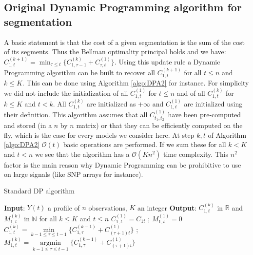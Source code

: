 \documentclass[11pt]{llncs}
\begin{document}
\subsection{Original Dynamic Programming algorithm for segmentation}

A basic statement is that the cost of a given segmentation is the sum of the cost of its segments. Thus the Bellman optimality principal holds and we have: $ C_{1, t}^{(k+1)} = \min_{\tau \leq t} \{ C_{1, \tau -1}^{(k)}  + C_{\tau, t}^{(1)} \} .$
Using this update rule  a Dynamic Programming algorithm can be built to recover all $ C_{1, t}^{(k+1)}$ for all $t \leq n$ and $k \leq K$.
This can be done using Algorithm \ref{algo:DPA2} for instance. 
For simplicity we did not include the initialization of all $C^{(1)}_{1,t}$ for $t \leq n$ and of all $C^{(k)}_{1,t}$ for $k \leq K$ and $t < k$.
All $C^{(k)}_{1,t}$ are initialized as $+\infty$ and $C^{(1)}_{1,t}$ are initialized using their definition.
This algorithm assumes that all $C_{t_1, t_2}^{(1)}$ have been pre-computed and stored (in 
a $n$ by $n$ matrix) or that they can be efficiently computed on the fly, which is the case for every models we consider here. At step $k, t$ of Algorithm \ref{algo:DPA2}  $\mathcal{O}(t)$ basic operations are performed. If we sum these for all $k < K$ and $t < n$  we see that the algorithm has a $\mathcal{O}(Kn^2)$ time complexity. This $n^2$ factor is the main reason why Dynamic Programming can be prohibitive to use on large signals (like SNP arrays for instance).
\begin{algorithm}
  \caption{Standard DP algorithm}\label{algo:DPA2}
  \begin{algorithmic}
    \State \textbf{Input}: $Y(t)$ a profile of $n$ observations, $K$ an integer
    \State \textbf{Output}: $C^{(k)}_{1,t}$ in $\mathbb{R}$ and $M^{(k)}_{1,t}$ in $\mathbb{N}$ for all $k \leq K$ and $t \leq n$
         \State $C^{(1)}_{1,t} = C_{1t}$ ; $M^{(1)}_{1,t} = 0$  
    \EndFor
     	\State $C^{(k)}_{1,t} = \underset{k-1 \leq \tau \leq t-1}{\min} \{ C^{(k-1)}_{1,\tau}+ C_{(\tau+1)t}^{(1)} \}$ ; $M^{(k)}_{1,t} =\underset{k-1 \leq \tau \leq t-1}{\operatorname{argmin}} \{ C^{(k-1)}_{1,\tau}+ C_{(\tau+1)t}^{(1)} \}$ 
        \EndFor   
     \EndFor
  \end{algorithmic}
\end{algorithm}
\end{document}

